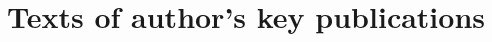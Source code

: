 \chapter{Texts of author’s key publications}
\label{app:publications}
\setcounter{totalappendix}{\value{chapter}} 



